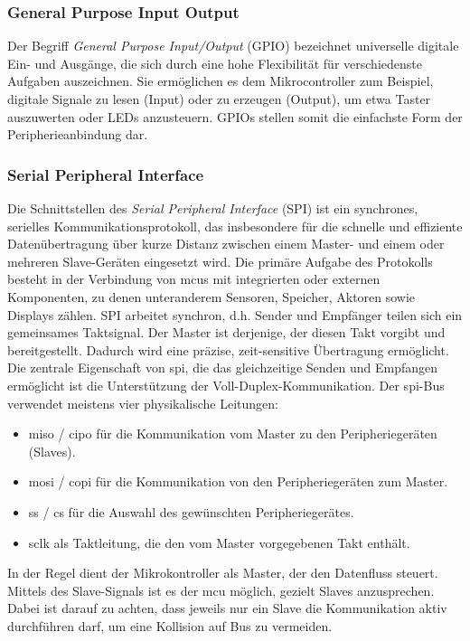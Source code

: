 \subsubsection*{General Purpose Input Output}
Der Begriff \emph{General Purpose Input/Output} (GPIO) bezeichnet universelle digitale Ein- und Ausgänge, die sich durch eine hohe Flexibilität für verschiedenste Aufgaben auszeichnen.
Sie ermöglichen es dem Mikrocontroller zum Beispiel, digitale Signale zu lesen (Input) oder zu erzeugen (Output), um etwa Taster auszuwerten oder LEDs anzusteuern. 
GPIOs stellen somit die einfachste Form der Peripherieanbindung dar.

\subsubsection*{Serial Peripheral Interface}
Die Schnittstellen des \emph{Serial Peripheral Interface} (SPI) ist ein synchrones, serielles Kommunikationsprotokoll, das insbesondere für die schnelle und effiziente Datenübertragung über kurze Distanz zwischen einem Master- und einem oder mehreren Slave-Geräten eingesetzt wird. 
Die primäre Aufgabe des Protokolls besteht in der Verbindung von \gls{mcu}s mit integrierten oder externen Komponenten, zu denen unteranderem  Sensoren, Speicher, Aktoren sowie Displays zählen.
SPI arbeitet synchron, d.h. Sender und Empfänger teilen sich ein gemeinsames Taktsignal.
Der Master ist derjenige, der diesen Takt vorgibt und bereitgestellt.
Dadurch wird eine präzise, zeit-sensitive Übertragung ermöglicht. 
Die zentrale Eigenschaft von \gls{spi}, die das gleichzeitige Senden und Empfangen ermöglicht ist die Unterstützung der Voll-Duplex-Kommunikation.
Der \gls{spi}-Bus verwendet meistens vier physikalische Leitungen:
\begin{itemize}
	\item \gls{miso} / \gls{cipo} für die Kommunikation vom Master zu den Peripheriegeräten (Slaves).
	\item \gls{mosi} / \gls{copi} für die Kommunikation von den Peripheriegeräten zum Master.
	\item \gls{ss} / \gls{cs} für die Auswahl des gewünschten Peripheriegerätes.
	\item \gls{sclk} als Taktleitung, die den vom Master vorgegebenen Takt enthält.
\end{itemize}

In der Regel dient der Mikrokontroller als Master, der den Datenfluss steuert.
Mittels des Slave-Signals ist es der \gls{mcu} möglich, gezielt Slaves anzusprechen.
Dabei ist darauf zu achten, dass jeweils nur ein Slave die Kommunikation aktiv durchführen darf, um eine Kollision auf Bus zu vermeiden.

